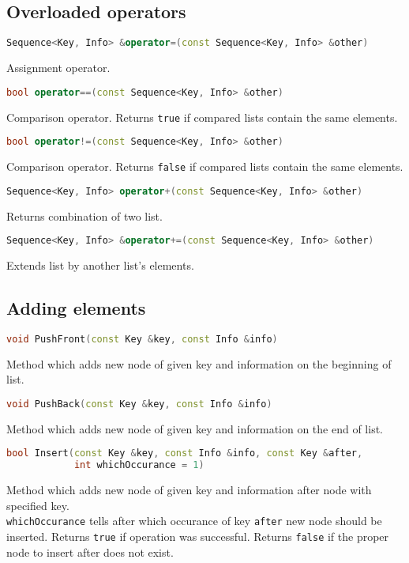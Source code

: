 \documentclass{article}
\begin{document}
\subsection{Overloaded operators}

\begin{lstlisting}[language=C++]
Sequence<Key, Info> &operator=(const Sequence<Key, Info> &other)
\end{lstlisting}
Assignment operator.

\begin{lstlisting}[language=C++]
bool operator==(const Sequence<Key, Info> &other)
\end{lstlisting}
Comparison operator. Returns {\tt true} if compared lists contain the same elements.

\begin{lstlisting}[language=C++]
bool operator!=(const Sequence<Key, Info> &other)
\end{lstlisting}
Comparison operator. Returns {\tt false} if compared lists contain the same elements.
\newpage

\begin{lstlisting}[language=C++]
Sequence<Key, Info> operator+(const Sequence<Key, Info> &other)
\end{lstlisting}
Returns combination of two list.

\begin{lstlisting}[language=C++]
Sequence<Key, Info> &operator+=(const Sequence<Key, Info> &other)
\end{lstlisting}
Extends list by another list's elements.

\subsection{Adding elements}

\begin{lstlisting}[language=C++]
void PushFront(const Key &key, const Info &info)
\end{lstlisting}
Method which adds new node of given key and information on the beginning of list.

\begin{lstlisting}[language=C++]
void PushBack(const Key &key, const Info &info)
\end{lstlisting}
Method which adds new node of given key and information on the end of list.

\begin{lstlisting}[language=C++]
bool Insert(const Key &key, const Info &info, const Key &after,
            int whichOccurance = 1)
\end{lstlisting}
Method which adds new node of given key and information after node with specified key.\\
{\tt whichOccurance} tells after which occurance of key {\tt after} new node should
be inserted. Returns {\tt true} if operation was successful. Returns {\tt false} if
the proper node to insert after does not exist.
\vspace{\baselineskip}
\end{document}
